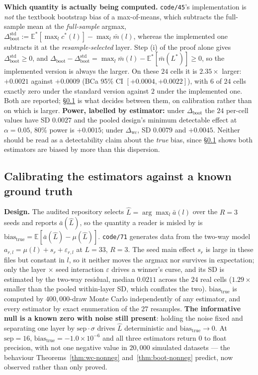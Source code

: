 \documentclass[10pt]{article} %
\begin{document}
\textbf{Which quantity is actually being computed.} \texttt{code/45}'s
implementation is \emph{not} the textbook bootstrap bias of a max-of-means,
which subtracts the full-sample mean at the \emph{full-sample} argmax,
$\Delta_{\text{boot}}^{\text{std}}:=\mathbb{E}^{*}[\max_l c^{*}(l)]-\max_l \bar
m(l)$, whereas the implemented one subtracts it at the
\emph{resample-selected} layer. Step (i) of the proof alone gives
$\Delta_{\text{boot}}^{\text{std}}\ge0$, and
$\Delta_{\text{boot}}-\Delta_{\text{boot}}^{\text{std}}=\max_l\bar
m(l)-\mathbb{E}^{*}[\bar m(L^{*})]\ge0$, so the implemented version is always
the larger. On these $24$ cells it is $2.35\times$ larger: $+0.0021$ against
$+0.0009$ (BCa 95\% CI $[+0.0004,+0.0022]$), with $6$ of $24$ cells exactly
zero under the standard version against $2$ under the implemented one. Both are
reported; \S\ref{sec:cs4-calibration} is what decides between them, on
calibration rather than on which is larger. \textbf{Power, labelled by
estimator:} under $\Delta_{\text{boot}}$ the $24$ per-cell values have SD
$0.0027$ and the pooled design's minimum detectable effect at $\alpha=0.05$,
$80\%$ power is $+0.0015$; under $\Delta_{\text{wc}}$, SD $0.0079$ and
$+0.0045$. Neither should be read as a detectability claim about the
\emph{true} bias, since \S\ref{sec:cs4-calibration} shows both estimators are
biased by more than this dispersion.

\subsection{Calibrating the estimators against a known ground truth}
\label{sec:cs4-calibration}

\textbf{Design.} The audited repository selects $\hat L=\arg\max_l \bar a(l)$
over the $R=3$ seeds and reports $\bar a(\hat L)$, so the quantity a reader is
misled by is $\text{bias}_{\text{true}}=\mathbb{E}[\bar a(\hat L)-\mu(\hat
L)]$. \texttt{code/71} generates data from the two-way model
$a_{r,l}=\mu(l)+s_r+\varepsilon_{r,l}$ at $L=33$, $R=3$. The seed main effect
$s_r$ is large in these files but constant in $l$, so it neither moves the
argmax nor survives in expectation; only the layer $\times$ seed interaction
$\varepsilon$ drives a winner's curse, and its SD is estimated by the two-way
residual, median $0.0211$ across the $24$ real cells ($1.29\times$ smaller than
the pooled within-layer SD, which conflates the two).
$\text{bias}_{\text{true}}$ is computed by $400{,}000$-draw Monte Carlo
independently of any estimator, and every estimator by exact enumeration of the
$27$ resamples. \textbf{The informative null is a known zero with noise still
present}: holding the noise fixed and separating one layer by
$\text{sep}\cdot\sigma$ drives $\hat L$ deterministic and
$\text{bias}_{\text{true}}\to0$. At $\text{sep}=16$,
$\text{bias}_{\text{true}}=-1.0\times10^{-6}$ and all three estimators return
$0$ to float precision, with not one negative value in $20{,}000$ simulated
datasets --- the behaviour Theorems~\ref{thm:wc-nonneg}
and~\ref{thm:boot-nonneg} predict, now observed rather than only proved.
\end{document}
